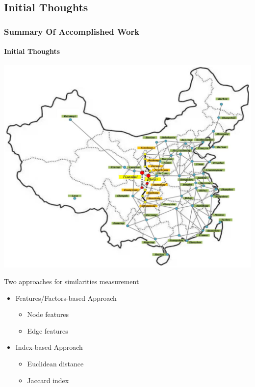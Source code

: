 \documentclass[light]{lutbeamer} %
\begin{document}
\subsection{Initial Thoughts}
\begin{frame}
    \frametitle{Summary Of Accomplished Work}
    \framesubtitle{Initial Thoughts}
    \begin{minipage}[c]{0.45\textwidth}
        \includegraphics[width=\textwidth]{figures/province_edge.png}
    \end{minipage}
    \hfill
    \begin{minipage}[c]{0.45\textwidth}
        Two approaches for similarities measurement
        \begin{itemize}
            \item \alert{Features/Factors-based Approach}
                  \begin{itemize}
                      \item Node features
                      \item Edge features
                  \end{itemize}
            \item Index-based Approach
                  \begin{itemize}
                      \item Euclidean distance
                      \item Jaccard index
                  \end{itemize}
        \end{itemize}
    \end{minipage}


\end{frame}
\end{document}
